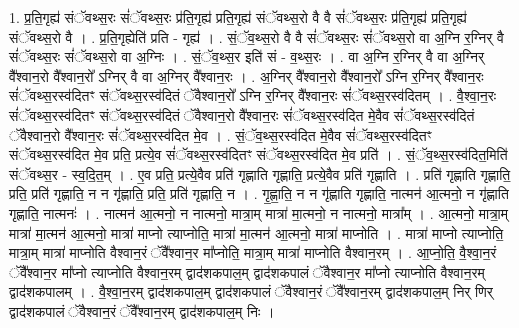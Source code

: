 \documentclass[17pt]{extarticle}
\begin{document}
1. प्र॒ति॒गृह्य॑ संॅवथ्स॒रः सं॑ॅवथ्स॒रः प्र॑ति॒गृह्य॑ प्रति॒गृह्य॑ संॅवथ्स॒रो वै वै सं॑ॅवथ्स॒रः प्र॑ति॒गृह्य॑ प्रति॒गृह्य॑ संॅवथ्स॒रो वै । . प्र॒ति॒गृह्येति॑ प्रति - गृह्य॑ । . सं॒ॅव॒थ्स॒रो वै वै सं॑ॅवथ्स॒रः सं॑ॅवथ्स॒रो वा अ॒ग्नि र॒ग्निर् वै सं॑ॅवथ्स॒रः सं॑ॅवथ्स॒रो वा अ॒ग्निः । . सं॒ॅव॒थ्स॒र इति॑ सं - व॒थ्स॒रः । . वा अ॒ग्नि र॒ग्निर् वै वा अ॒ग्निर् वै᳚श्वान॒रो वै᳚श्वान॒रो᳚ ऽग्निर् वै वा अ॒ग्निर् वै᳚श्वान॒रः । . अ॒ग्निर् वै᳚श्वान॒रो वै᳚श्वान॒रो᳚ ऽग्नि र॒ग्निर् वै᳚श्वान॒रः सं॑ॅवथ्स॒रस्व॑दितꣳ संॅवथ्स॒रस्व॑दितं ॅवैश्वान॒रो᳚ ऽग्नि र॒ग्निर् वै᳚श्वान॒रः सं॑ॅवथ्स॒रस्व॑दितम् । . वै॒श्वा॒न॒रः सं॑ॅवथ्स॒रस्व॑दितꣳ संॅवथ्स॒रस्व॑दितं ॅवैश्वान॒रो वै᳚श्वान॒रः सं॑ॅवथ्स॒रस्व॑दित मे॒वैव सं॑ॅवथ्स॒रस्व॑दितं ॅवैश्वान॒रो वै᳚श्वान॒रः सं॑ॅवथ्स॒रस्व॑दित मे॒व । . सं॒ॅव॒थ्स॒रस्व॑दित मे॒वैव सं॑ॅवथ्स॒रस्व॑दितꣳ संॅवथ्स॒रस्व॑दित मे॒व प्रति॒ प्रत्ये॒व सं॑ॅवथ्स॒रस्व॑दितꣳ संॅवथ्स॒रस्व॑दित मे॒व प्रति॑ । . सं॒ॅव॒थ्स॒रस्व॑दित॒मिति॑ संॅवथ्स॒र - स्व॒दि॒त॒म् । . ए॒व प्रति॒ प्रत्ये॒वैव प्रति॑ गृह्णाति गृह्णाति॒ प्रत्ये॒वैव प्रति॑ गृह्णाति । . प्रति॑ गृह्णाति गृह्णाति॒ प्रति॒ प्रति॑ गृह्णाति॒ न न गृ॑ह्णाति॒ प्रति॒ प्रति॑ गृह्णाति॒ न । . गृ॒ह्णा॒ति॒ न न गृ॑ह्णाति गृह्णाति॒ नात्मन॑ आ॒त्मनो॒ न गृ॑ह्णाति गृह्णाति॒ नात्मनः॑ । . नात्मन॑ आ॒त्मनो॒ न नात्मनो॒ मात्रा॒म् मात्रा॑ मा॒त्मनो॒ न नात्मनो॒ मात्रा᳚म् । . आ॒त्मनो॒ मात्रा॒म् मात्रा॑ मा॒त्मन॑ आ॒त्मनो॒ मात्रा॑ माप्नो त्याप्नोति॒ मात्रा॑ मा॒त्मन॑ आ॒त्मनो॒ मात्रा॑ माप्नोति । . मात्रा॑ माप्नो त्याप्नोति॒ मात्रा॒म् मात्रा॑ माप्नोति वैश्वान॒रं ॅवै᳚श्वान॒र मा᳚प्नोति॒ मात्रा॒म् मात्रा॑ माप्नोति वैश्वान॒रम् । . आ॒प्नो॒ति॒ वै॒श्वा॒न॒रं ॅवै᳚श्वान॒र मा᳚प्नो त्याप्नोति वैश्वान॒रम् द्वाद॑शकपाल॒म् द्वाद॑शकपालं ॅवैश्वान॒र मा᳚प्नो त्याप्नोति वैश्वान॒रम् द्वाद॑शकपालम् । . वै॒श्वा॒न॒रम् द्वाद॑शकपाल॒म् द्वाद॑शकपालं ॅवैश्वान॒रं ॅवै᳚श्वान॒रम् द्वाद॑शकपाल॒म् निर् णिर् द्वाद॑शकपालं ॅवैश्वान॒रं ॅवै᳚श्वान॒रम् द्वाद॑शकपाल॒म् निः । \newline
\end{document}
